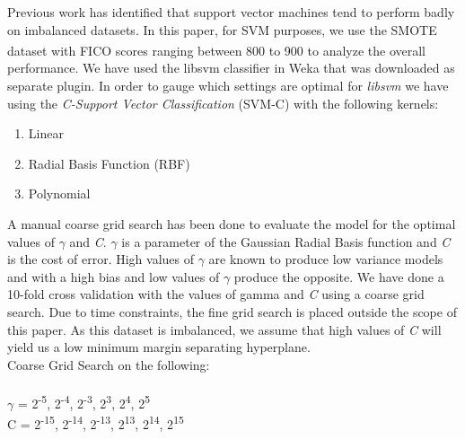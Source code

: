 \documentclass[conference]{IEEEtran}
\begin{document}
Previous work has identified that support vector machines tend to perform badly on imbalanced datasets\cite{akbani2004}. In this paper, for SVM purposes, we use the SMOTE dataset with FICO\textsuperscript{\textregistered} scores ranging between 800 to 900 to analyze the overall performance. We have used the libsvm classifier in Weka that was downloaded as separate plugin. In order to gauge which settings are optimal for \textit{libsvm} we have using the \textit{C-Support Vector Classification} (SVM-C) with the following kernels:

\begin{enumerate} 
\item Linear
\item Radial Basis Function (RBF)
\item Polynomial
 \end{enumerate}

A manual coarse grid search has been done to evaluate the model for the optimal values of ${\gamma}$ and \textit{C}.
${\gamma}$ is a parameter of the Gaussian Radial Basis function and \textit{C} is the cost of error. High values of ${\gamma}$ are known to produce low variance models and with a high bias and low values of ${\gamma}$ produce the opposite. We have done a 10-fold cross validation with the values of gamma and \textit{C} using a coarse grid search\cite{chang2011libsvm}. Due to time constraints, the fine grid search is placed outside the scope of this paper. As this dataset is imbalanced, we assume that high values of \textit{C} will yield us a low minimum margin separating hyperplane.\\

Coarse Grid Search on the following:\\\\
${\gamma}$ = 2\textsuperscript{-5}, 2\textsuperscript{-4}, 2\textsuperscript{-3}, 2\textsuperscript{3}, 2\textsuperscript{4}, 2\textsuperscript{5}\\
C = 2\textsuperscript{-15}, 2\textsuperscript{-14}, 2\textsuperscript{-13}, 2\textsuperscript{13}, 2\textsuperscript{14}, 2\textsuperscript{15}
 
\end{document}
